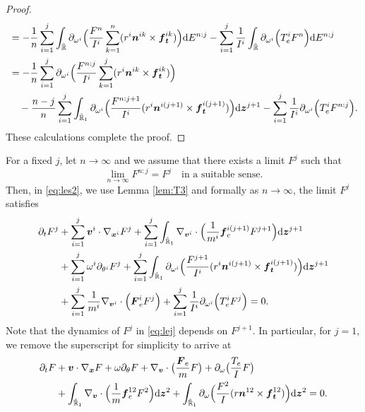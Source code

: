 \documentclass[a4paper,11pt]{article}
\numberwithin{equation}{section}
\theoremstyle{definition}
\newcommand{\bfx}{\boldsymbol{x}}
\newcommand{\bfz}{\boldsymbol{z}}
\newcommand{\bfv}{\boldsymbol{v}}
\newcommand{\bfn}{\boldsymbol{n}}
\newcommand{\bft}{\boldsymbol{t}}
\newcommand{\bff}{\boldsymbol{f}}
\newcommand{\bfF}{\boldsymbol{F}}
\newcommand{\bbr}{\mathbb R}
\def\d{{  \rm d}}
\begin{document}
\begin{proof}
\begin{align*}
     & = -\frac{1}{n} \sum_{i=1}^{j}  \int_{\hat{\bbr}} \partial_{\omega^i} \Big( \frac{F^n }{I^i}  \sum_{k=1}^{n} ( r^i\bfn^{ik}\times \bff_{\bft}^{ik}) \Big) \d E^{n:j}
     - \sum_{i=1}^{j}  \frac{1}{I^i} \int_{\hat{\bbr}} \partial_{\omega^i} \Big( T^i_e F^n \Big) \d E^{n:j} \\
    & =-\frac{1}{n} \sum_{i=1}^{j}  \partial_{\omega^i} \Big( \frac{F^{n:j} }{I^i}  \sum_{k=1}^{j} ( r^i\bfn^{ik}\times \bff_{\bft}^{ik}) \Big)  \\
   & \quad -\frac{n-j}{n} \sum_{i=1}^{j}  \int_{\hat{\bbr}_1} \partial_{\omega^i}\Big( \frac{F^{n:j+1}}{I^i} ( r^i\bfn^{i(j+1)}\times \bff_{\bft}^{i(j+1)}) \Big)\d\bfz^{j+1} 
 - \sum_{i=1}^{j}  \frac{1}{I^i} \partial_{\omega^i} \Big( T^i_e F^{n:j} \Big).
\end{align*}
These calculations complete the proof.
\end{proof}

For a fixed $j$, let  $n \to \infty$ and we assume that there exists a limit $F^j$ such that 
\[ \lim_{n \to \infty} F^{n:j} = F^j \quad \mbox{in a suitable sense}.  \]
%
Then, in \eqref{eq:les2}, we use Lemma \ref{lem:T3} and formally as $n \to \infty$, the limit $F^j$ satisfies 
%
\begin{align}
\begin{aligned} \label{eq:lej}
  \partial_t F^{j} & +  \sum_{i=1}^j  \bfv^i  \cdot \nabla_{\bfx^i} F^{j}  +\sum_{i=1}^{j}  \int_{\hat{\bbr}_1} \nabla_{\bfv^i} \cdot \Big( \frac{1}{m^i} \bff_c^{i(j+1)} F^{j+1} \Big)\d\bfz^{j+1} \\
  & + \sum_{i=1}^j \omega^i  \partial_{\theta^i}  F^j
  + \sum_{i=1}^{j}  \int_{\hat{\bbr}_1} \partial_{\omega^i}\Big( \frac{F^{j+1}}{I^i} ( r^i\bfn^{i(j+1)}\times \bff_{\bft}^{i(j+1)}) \Big)\d\bfz^{j+1} \\
 & + \sum_{i=1}^{j} \frac{1}{m^i}  \nabla_{\bfv^i} \cdot \Big( \bfF^i_eF^{j} \Big) 
  +  \sum_{i=1}^{j}  \frac{1}{I^i} \partial_{\omega^i} \Big( T^i_e F^j \Big)
= 0.
\end{aligned}
\end{align}
%
Note that the dynamics of $F^j$ in \eqref{eq:lej} depends on $F^{j+1}$.  In particular, for $j=1$, we remove the superscript for simplicity to arrive at
\begin{align}
\begin{aligned} \label{eq:lej1}
  \partial_t F & +   \bfv  \cdot \nabla_{\bfx} F  + \omega \partial_\theta F + \nabla_{\bfv} \cdot \big( \frac{\bfF_e}{m} F \big)  
  +  \partial_{\omega} \big( \frac{T_e}{I} F \big) \\
& +  \int_{\hat{\bbr}_1} \nabla_{\bfv} \cdot \Big( \frac{1}{m} \bff_c^{12} F^{2} \Big)\d\bfz^{2} 
+ \int_{\hat{\bbr}_1} \partial_{\omega}\Big( \frac{F^2}{I} ( r\bfn^{12}\times \bff_{\bft}^{12}) \Big)\d\bfz^{2}
= 0.
\end{aligned}
\end{align}
\end{document}
